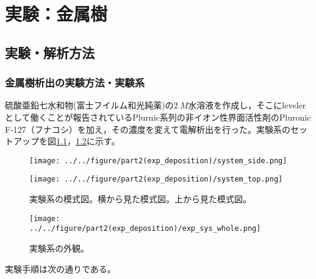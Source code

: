 \documentclass[autodetect-engine,dvi=dvipdfmx,a4paper,ja=standard,oneside,openany,11pt]{bxjsbook}
\begin{document}
\chapter{実験：金属樹}
\section{実験・解析方法}
\subsection{金属樹析出の実験方法・実験系}
硫酸亜鉛七水和物(富士フイルム和光純薬)の$\SI{2}{M}$水溶液を作成し，そこにlevelerとして働くことが報告されている\cite{gallaway2008peg}\cite{wu2025decoding}Plurnic系列の非イオン性界面活性剤のPluronic F-127（フナコシ）を加え，その濃度を変えて電解析出を行った。実験系のセットアップを図\ref{fig:system_exp}，\ref{fig:system_exp_whole}に示す。

\begin{figure}[htbp]
  \begin{minipage}
    {0.55\textwidth}
    \subcaption{}
    \centering
    \texttt{[image: ../../figure/part2(exp\_deposition)/system\_side.png]}
    \label{fig:system_side}
  \end{minipage}
  \begin{minipage}
    {0.43\textwidth}
    \subcaption{}
    \centering
    \texttt{[image: ../../figure/part2(exp\_deposition)/system\_top.png]}
    \label{fig:system_top}
  \end{minipage}
  \caption{実験系の模式図。横から見た模式図。上から見た模式図。}
  \label{fig:system_exp}
\end{figure}

\begin{figure}[htbp]
  \centering
  \texttt{[image: ../../figure/part2(exp\_deposition)/exp\_sys\_whole.png]}
  \caption{実験系の外観。}
  \label{fig:system_exp_whole}
\end{figure}

実験手順は次の通りである。
\end{document}
